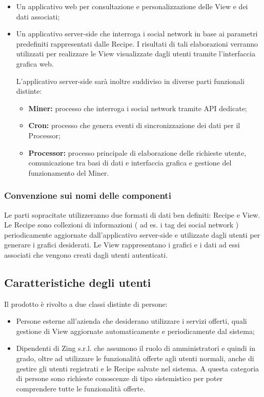 \begin{itemize}
\item Un applicativo web per consultazione e personalizzazione delle View e dei dati associati;
\item Un applicativo server-side che interroga i social network in base ai parametri predefiniti rappresentati dalle Recipe. I risultati di tali elaborazioni verranno utilizzati per realizzare le View visualizzate dagli utenti tramite l'interfaccia grafica web.

L'applicativo server-side sarà inoltre suddiviso in diverse parti funzionali distinte:
\begin{itemize}
\item \textbf{Miner:} processo che interroga i social network tramite API dedicate;
\item \textbf{Cron:} processo che genera eventi di sincronizzazione dei dati per il Processor;
\item \textbf{Processor:} processo principale di elaborazione delle richieste utente, comunicazione tra basi di dati e interfaccia grafica e gestione del funzionamento del Miner.
\end{itemize}
\end{itemize}

\subsubsection{Convenzione sui nomi delle componenti}
Le parti sopracitate utilizzeranno due formati di dati ben definiti: Recipe e View.
Le Recipe sono collezioni di informazioni ( ad es. i tag dei social network ) periodicamente aggiornate dall'applicativo server-side e utilizzate dagli utenti per generare i grafici desiderati.
Le View rappresentano i grafici e i dati ad essi associati che vengono creati dagli utenti autenticati.

\subsection{Caratteristiche degli utenti}
Il prodotto è rivolto a due classi distinte di persone:

\begin{itemize}
\item Persone esterne all'azienda che desiderano utilizzare i servizi offerti, quali gestione di View aggiornate automaticamente e periodicamente dal sistema;
\item Dipendenti di Zing s.r.l. che assumono il ruolo di amministratori e quindi in grado, oltre ad utilizzare le funzionalità offerte agli utenti normali, anche di gestire gli utenti registrati e le Recipe salvate nel sistema.
A questa categoria di persone sono richieste conoscenze di tipo sistemistico per poter comprendere tutte le funzionalità offerte.
\end{itemize}


